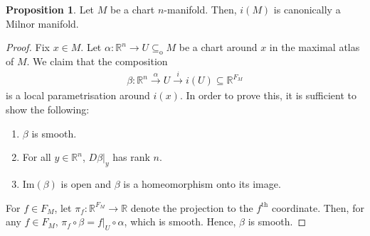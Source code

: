 \documentclass[10pt]{amsart}
\theoremstyle{definition}
\newtheorem{prop}[thm]{Proposition}
\begin{document}
\begin{prop}\label{mainprop}
	Let $M$ be a chart $n$-manifold. Then, $i(M)$ is canonically a Milnor manifold.  
\end{prop}
\begin{proof}
 Fix $x\in M$.  Let $\alpha :\mathbb{R} ^{n} \rightarrow U \subseteq_{\text{o} } M$ be a chart around $x$ in the maximal atlas of $M$. We claim that the composition
 \begin{align*}
	 \beta :\mathbb{R} ^{n}\xrightarrow{\alpha } U \xrightarrow{i} i(U)\subseteq \mathbb{R} ^{F_{M}}
 \end{align*}
 is a local parametrisation around $i(x)$. In order to prove this, it is sufficient to show the following:
 \begin{enumerate}[label=(\arabic*)]
  \item $\beta $ is smooth.
\item For all $y\in \mathbb{R} ^{n}$, $D\beta \vert_{y}$ has rank $n$.   
 \item $\text{Im}(\beta )$ is open and $\beta$ is a homeomorphism onto its image.
 \end{enumerate}
 For $f\in F_{M}$, let $\pi _{f}:\mathbb{R} ^{F_{M}}\rightarrow \mathbb{R} $ denote the projection to the $f^{\text{th} }$ coordinate. Then, for any $f\in F_{M}$, $\pi _{f}\circ \beta = f\vert_{U}\circ \alpha $, which is smooth. Hence, $\beta $ is smooth.


\end{proof}
\end{document}
